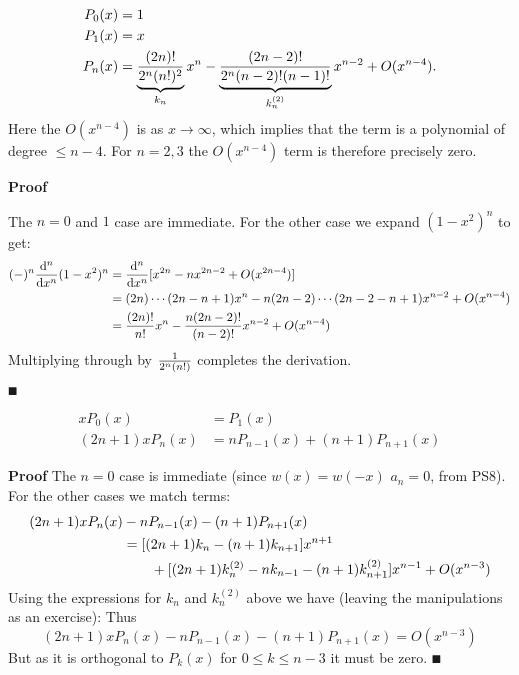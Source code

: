 \begin{lemma}
\begin{align*}
P_0(x) &= 1 \\
P_1(x) &= x \\
P_n(x) &= \underbrace{{(2n)! \over 2^n (n!)^2}}_{k_n} x^n - \underbrace{(2n-2)! \over 2^n (n-2)! (n-1)!}_{k_n^{(2)}} x^{n-2} + O(x^{n-4}).
\end{align*}
Here the $O(x^{n-4})$ is as $x \ensuremath{\rightarrow} \ensuremath{\infty}$, which implies that the term is a polynomial of degree $\ensuremath{\leq} n-4$. For $n = 2,3$ the $O(x^{n-4})$ term is therefore precisely zero.

\end{lemma}
\textbf{Proof}

The $n=0$ and $1$ case are immediate. For the other case we expand $(1-x^2)^n$ to get:
\begin{align*}
(-)^n {{\rm d}^n \over {\rm d} x^n} (1-x^2)^n &=
{{\rm d}^n \over {\rm d} x^n} [ x^{2n} - n x^{2n-2} + O(x^{2n-4})]\\
&= (2n)\ensuremath{\cdots}(2n-n+1) x^n - n (2n-2)\ensuremath{\cdots}(2n-2-n+1) x^{n-2} + O(x^{n-4}) \\
&= {(2n)! \over n!} x^n - {n (2n-2)! \over (n-2)!} x^{n-2} + O(x^{n-4})
\end{align*}
Multiplying through by ${1 \over 2^n (n!)}$ completes the derivation.

\ensuremath{\QED}

\begin{theorem}
\begin{align*}
xP_0(x) &= P_1(x) \\
(2n+1) xP_n(x) &= nP_{n-1}(x) + (n+1)P_{n+1}(x)
\end{align*}
\end{theorem}
\textbf{Proof} The $n = 0$ case is immediate (since $w(x) = w(-x)$ $a_n = 0$, from PS8). For the other cases we match terms:
\begin{align*}
(2n+1)xP_n(x) &- n P_{n-1}(x) - (n+1)P_{n+1}(x) \ccr
 = [(2n+1)k_n - (n+1) k_{n+1}] x^{n+1} \cr
 &\qquad  + [(2n+1) k_n^{(2)} -n k_{n-1} - (n+1) k_{n+1}^{(2)}] x^{n-1} + O(x^{n-3})
\end{align*}
Using the expressions for $k_n$ and $k_n^{(2)}$ above we have (leaving the manipulations as an exercise):
Thus
\[
(2n+1)xP_n(x) - n P_{n-1}(x) - (n+1)P_{n+1}(x) = O(x^{n-3})
\]
But as it is orthogonal to $P_k(x)$ for $0 \ensuremath{\leq} k \ensuremath{\leq} n-3$ it must be zero. \ensuremath{\QED}



